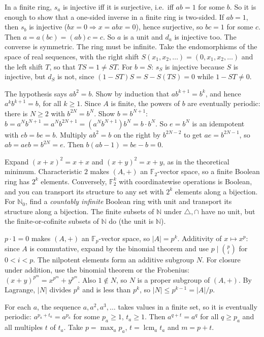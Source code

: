 \documentclass[11pt,a4paper]{article}
\begin{document}

 In a finite ring, $s_a$ is injective iff it is surjective, i.e.\ iff $ab=1$ for some $b$. So it is enough to show that a one-sided inverse in a finite ring is two-sided.
 If $ab=1$, then $s_b$ is injective ($bx=0\Rightarrow x=abx=0$), hence surjective, so $bc=1$ for some $c$. Then $a=a(bc)=(ab)c=c$. So $a$ is a unit and $d_a$ is injective too. The converse is symmetric.
 The ring must be infinite. Take the endomorphisms of the space of real sequences, with the right shift $S(x_1,x_2,\dots)=(0,x_1,x_2,\dots)$ and the left shift $T$, so that $TS=1\ne ST$.
 For $b=S$: $s_S$ is injective because $S$ is injective, but $d_S$ is not, since $(1-ST)S=S-S(TS)=0$ while $1-ST\ne0$.

 The hypothesis says $ab^2=b$. Show by induction that $ab^{k+1}=b^k$, and hence $a^kb^{k+1}=b$, for all $k\ge1$. Since $A$ is finite, the powers of $b$ are eventually periodic: there is $N\ge2$ with $b^{2N}=b^N$.
 Show $b=b^{N+1}$: $b=a^Nb^{N+1}=a^Nb^{2N+1}=(a^Nb^{N+1})b^N=b\cdot b^N$. So $e=b^N$ is an idempotent with $eb=be=b$.
 Multiply $ab^2=b$ on the right by $b^{2N-2}$ to get $ae=b^{2N-1}$, so $ab=aeb=b^{2N}=e$. Then $b(ab-1)=be-b=0$.

 Expand $(x+x)^2=x+x$ and $(x+y)^2=x+y$, as in the theoretical minimum.
 Characteristic $2$ makes $(A,+)$ an $\mathbb F_2$-vector space, so a finite Boolean ring has $2^k$ elements. Conversely, $\mathbb F_2^k$ with coordinatewise operations is Boolean, and you can transport its structure to any set with $2^k$ elements along a bijection.
 For $\mathbb N_0$, find a \emph{countably infinite} Boolean ring with unit and transport its structure along a bijection. The finite subsets of $\mathbb N$ under $\triangle,\cap$ have no unit, but the finite-or-cofinite subsets of $\mathbb N$ do (the unit is $\mathbb N$).

 $p\cdot1=0$ makes $(A,+)$ an $\mathbb F_p$-vector space, so $|A|=p^k$. Additivity of $x\mapsto x^p$: since $A$ is commutative, expand by the binomial theorem and use $p\mid\binom pi$ for $0<i<p$.
 The nilpotent elements form an additive subgroup $N$. For closure under addition, use the binomial theorem or the Frobenius: $(x+y)^{p^m}=x^{p^m}+y^{p^m}$. Also $1\notin N$, so $N$ is a proper subgroup of $(A,+)$.
 By Lagrange, $|N|$ divides $p^k$ and is less than $p^k$, so $|N|\le p^{k-1}=|A|/p$.

 For each $a$, the sequence $a,a^2,a^3,\dots$ takes values in a finite set, so it is eventually periodic: $a^{p_a+t_a}=a^{p_a}$ for some $p_a\ge1$, $t_a\ge1$. Then $a^{q+t}=a^{q}$ for all $q\ge p_a$ and all multiples $t$ of $t_a$.
 Take $p=\max_a p_a$, $t=\operatorname{lcm}_a t_a$ and $m=p+t$.
\end{document}

